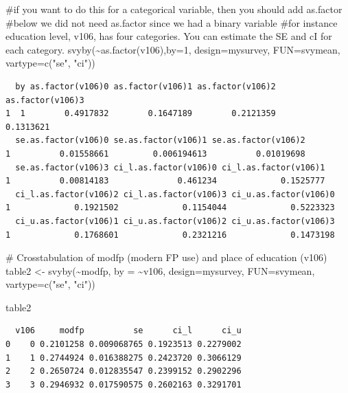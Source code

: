 \documentclass[
  letterpaper,
  DIV=11,
  numbers=noendperiod]{scrartcl}
\newenvironment{Shaded}{\begin{snugshade}}{\end{snugshade}}
\newcommand{\AttributeTok}[1]{\textcolor[rgb]{0.40,0.45,0.13}{#1}}
\newcommand{\CommentTok}[1]{\textcolor[rgb]{0.37,0.37,0.37}{#1}}
\newcommand{\DecValTok}[1]{\textcolor[rgb]{0.68,0.00,0.00}{#1}}
\newcommand{\FunctionTok}[1]{\textcolor[rgb]{0.28,0.35,0.67}{#1}}
\newcommand{\NormalTok}[1]{\textcolor[rgb]{0.00,0.23,0.31}{#1}}
\newcommand{\OtherTok}[1]{\textcolor[rgb]{0.00,0.23,0.31}{#1}}
\newcommand{\SpecialCharTok}[1]{\textcolor[rgb]{0.37,0.37,0.37}{#1}}
\newcommand{\StringTok}[1]{\textcolor[rgb]{0.13,0.47,0.30}{#1}}
\begin{document}
\begin{Shaded}
\begin{Highlighting}[]
\CommentTok{\#if you want to do this for a categorical variable, then you should add as.factor}
\CommentTok{\#below we did not need as.factor since we had a binary variable}
\CommentTok{\#for instance education level, v106, has four categories. You can estimate the SE and cI for each category.}
\FunctionTok{svyby}\NormalTok{(}\SpecialCharTok{\textasciitilde{}}\FunctionTok{as.factor}\NormalTok{(v106),}\AttributeTok{by=}\DecValTok{1}\NormalTok{,  }\AttributeTok{design=}\NormalTok{mysurvey, }\AttributeTok{FUN=}\NormalTok{svymean, }\AttributeTok{vartype=}\FunctionTok{c}\NormalTok{(}\StringTok{"se"}\NormalTok{, }\StringTok{"ci"}\NormalTok{))}
\end{Highlighting}
\end{Shaded}

\begin{verbatim}
  by as.factor(v106)0 as.factor(v106)1 as.factor(v106)2 as.factor(v106)3
1  1        0.4917832        0.1647189        0.2121359        0.1313621
  se.as.factor(v106)0 se.as.factor(v106)1 se.as.factor(v106)2
1          0.01558661         0.006194613          0.01019698
  se.as.factor(v106)3 ci_l.as.factor(v106)0 ci_l.as.factor(v106)1
1          0.00814183              0.461234             0.1525777
  ci_l.as.factor(v106)2 ci_l.as.factor(v106)3 ci_u.as.factor(v106)0
1             0.1921502             0.1154044             0.5223323
  ci_u.as.factor(v106)1 ci_u.as.factor(v106)2 ci_u.as.factor(v106)3
1             0.1768601             0.2321216             0.1473198
\end{verbatim}

\begin{Shaded}
\begin{Highlighting}[]
\CommentTok{\# Crosstabulation of modfp (modern FP use) and place of education (v106)}
\NormalTok{table2 }\OtherTok{\textless{}{-}} \FunctionTok{svyby}\NormalTok{(}\SpecialCharTok{\textasciitilde{}}\NormalTok{modfp, }\AttributeTok{by =} \SpecialCharTok{\textasciitilde{}}\NormalTok{v106, }\AttributeTok{design=}\NormalTok{mysurvey, }\AttributeTok{FUN=}\NormalTok{svymean, }\AttributeTok{vartype=}\FunctionTok{c}\NormalTok{(}\StringTok{"se"}\NormalTok{, }\StringTok{"ci"}\NormalTok{))}

\NormalTok{table2}
\end{Highlighting}
\end{Shaded}

\begin{verbatim}
  v106     modfp          se      ci_l      ci_u
0    0 0.2101258 0.009068765 0.1923513 0.2279002
1    1 0.2744924 0.016388275 0.2423720 0.3066129
2    2 0.2650724 0.012835547 0.2399152 0.2902296
3    3 0.2946932 0.017590575 0.2602163 0.3291701
\end{verbatim}
\end{document}
